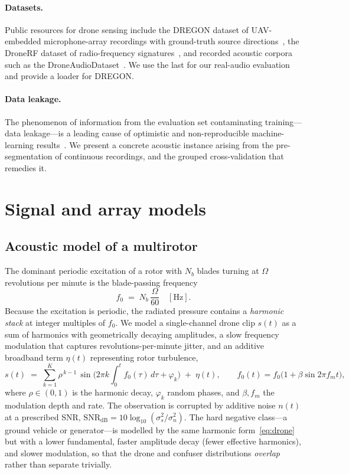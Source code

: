 \documentclass[11pt]{article}
\begin{document}
\paragraph{Datasets.} Public resources for drone sensing include the DREGON
dataset of UAV-embedded microphone-array recordings with ground-truth source
directions~\cite{dregon}, the DroneRF dataset of radio-frequency
signatures~\cite{dronerf}, and recorded acoustic corpora such as the
DroneAudioDataset~\cite{alemadi}. We use the last for our real-audio evaluation
and provide a loader for DREGON.

\paragraph{Data leakage.} The phenomenon of information from the evaluation set
contaminating training---data leakage---is a leading cause of optimistic and
non-reproducible machine-learning results~\cite{kapoor}. We present a concrete
acoustic instance arising from the pre-segmentation of continuous recordings, and
the grouped cross-validation that remedies it.

\section{Signal and array models}
\label{sec:model}

\subsection{Acoustic model of a multirotor}
The dominant periodic excitation of a rotor with $N_b$ blades turning at
$\Omega$ revolutions per minute is the blade-passing frequency
\begin{equation}
f_0 \;=\; N_b\,\frac{\Omega}{60}\quad[\mathrm{Hz}].
\label{eq:bpf}
\end{equation}
Because the excitation is periodic, the radiated pressure contains a
\emph{harmonic stack} at integer multiples of $f_0$. We model a single-channel
drone clip $s(t)$ as a sum of harmonics with geometrically decaying amplitudes,
a slow frequency modulation that captures revolutions-per-minute jitter, and an
additive broadband term $\eta(t)$ representing rotor turbulence,
\begin{equation}
s(t) \;=\; \sum_{k=1}^{K} \rho^{\,k-1}\,
\sin\!\Big(2\pi k \!\int_0^t\! f_0(\tau)\,d\tau + \varphi_k\Big)
\;+\; \eta(t),
\qquad
f_0(t) = f_0\big(1 + \beta \sin 2\pi f_m t\big),
\label{eq:drone}
\end{equation}
where $\rho\in(0,1)$ is the harmonic decay, $\varphi_k$ random phases, and
$\beta,f_m$ the modulation depth and rate. The observation is corrupted by
additive noise $n(t)$ at a prescribed SNR,
$\mathrm{SNR}_{\mathrm{dB}} = 10\log_{10}(\sigma_s^2/\sigma_n^2)$.
The hard negative class---a ground vehicle or generator---is modelled by the same
harmonic form~\eqref{eq:drone} but with a lower fundamental, faster amplitude
decay (fewer effective harmonics), and slower modulation, so that the drone and
confuser distributions \emph{overlap} rather than separate trivially.
\end{document}
